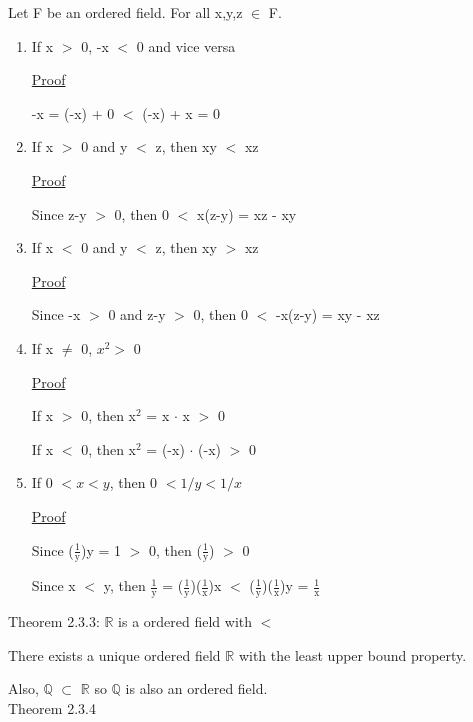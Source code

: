 	\qquad Let F be an ordered field. For all x,y,z $\in$ F.
	\begin{enumerate}[label=(\alph*), leftmargin=2cm]
		\item If x $>$ 0, -x $<$ 0 and vice versa
	
			{ \color{magenta} \underline{Proof} } 
	
				-x = (-x) + 0 $<$ (-x) + x = 0

		\item If x $>$ 0 and y $<$ z, then xy $<$ xz
	
			{ \color{magenta} \underline{Proof} } 
		
				Since z-y $>$ 0, then 0 $<$ x(z-y) = xz - xy

		\item If x $ < $ 0 and y $ < $ z, then xy $ > $ xz

			{ \color{magenta} \underline{Proof} } 
		
				Since -x $>$ 0 and z-y $>$ 0, then 0 $<$ -x(z-y) = xy - xz
	
		\item If x $\neq$ 0, $x^2 > $ 0

			{ \color{magenta} \underline{Proof} } 
		
				If x $>$ 0, then x$^\text{2}$ = x $\cdot$ x $>$ 0

				If x $<$ 0, then x$^\text{2}$ = (-x) $\cdot$ (-x) $>$ 0
	
		\item If 0 $< x < y$, then 0 $< 1/y < 1/x$

			{ \color{magenta} \underline{Proof} } 
		
				Since ($\frac{1}{\text{y}}$)y = 1 $>$ 0, then ($\frac{1}{\text{y}}$) $>$ 0

				Since x $<$ y, then $\frac{1}{\text{y}}$
				= ($\frac{1}{\text{y}}$)($\frac{1}{\text{x}}$)x
				$<$ ($\frac{1}{\text{y}}$)($\frac{1}{\text{x}}$)y = $\frac{1}{\text{x}}$ 
	\end{enumerate}

{\color{red} Theorem 2.3.3: $\mathbb{R}$ is a ordered field with $<$ }

	\qquad There exists a unique ordered field $ \mathbb{R} $ with the least upper bound property.

	\qquad Also, $ \mathbb{Q} $  $\subset$ $ \mathbb{R} $ so $\mathbb{Q}$ is also an ordered field. \\

{\color{red} Theorem 2.3.4}


